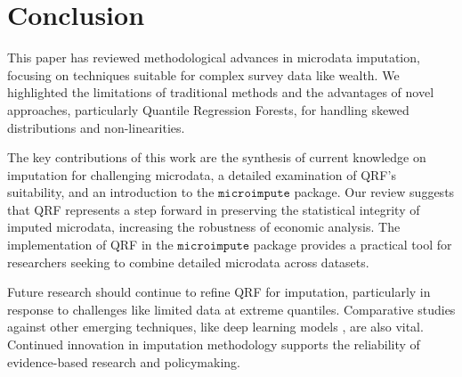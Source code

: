 \section{Conclusion}

This paper has reviewed methodological advances in microdata imputation, focusing on techniques suitable for complex survey data like wealth. We highlighted the limitations of traditional methods and the advantages of novel approaches, particularly Quantile Regression Forests, for handling skewed distributions and non-linearities.

The key contributions of this work are the synthesis of current knowledge on imputation for challenging microdata, a detailed examination of QRF's suitability, and an introduction to the $\texttt{microimpute}$ package. Our review suggests that QRF represents a step forward in preserving the statistical integrity of imputed microdata, increasing the robustness of economic analysis. The implementation of QRF in the $\texttt{microimpute}$ package provides a practical tool for researchers seeking to combine detailed microdata across datasets.

Future research should continue to refine QRF for imputation, particularly in response to challenges like limited data at extreme quantiles. Comparative studies against other emerging techniques, like deep learning models \citep{alaa2024deep}, are also vital. Continued innovation in imputation methodology supports the reliability of evidence-based research and policymaking.